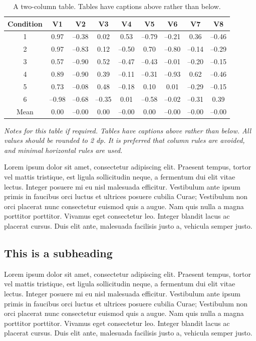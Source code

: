 \documentclass[paper=a4,fontsize=11pt,twocolumn]{article}
\begin{document}
\begin{table}
\begin{centering}
\caption{A two-column table. Tables have captions above rather than below.}\label{tab:two-column}%
	\begin{tabular}[\columnwidth]{ccccccccc}\toprule
	Condition & V1 & V2 & V3 & V4 & V5 & V6 & V7 & V8 \\
	\midrule
	1 & 0.97 & --0.38 & 0.02 & 0.53 & --0.79 & --0.21 & 0.36 & --0.46 \\
	2 & 0.97 & --0.83 & 0.12 & --0.50 & 0.70 & --0.80 & --0.14 & --0.29 \\
	3 & 0.57 & --0.90 & 0.52 & --0.47 & --0.43 & --0.01 & --0.20 & --0.15 \\
	4 & 0.89 & --0.90 & 0.39 & --0.11 & --0.31 & --0.93 & 0.62 & --0.46 \\
	5 & 0.73 & --0.08 & 0.48 & --0.18 & 0.10 & 0.01 & --0.29 & --0.15 \\
	6 & --0.98 & --0.68 & --0.35 & 0.01 & --0.58 & --0.02 & --0.31 & 0.39 \\
	\cmidrule{2-9}
	Mean & 0.00 & --0.00 & 0.00 & --0.00 & 0.00 & --0.00 & --0.00 & --0.00 \\
	\bottomrule
	\end{tabular}\par
	\medskip
\textit{Notes for this table if required. Tables have captions above rather than below. All values should be rounded to 2 dp. It is preferred that column rules are avoided, and minimal horizontal rules are used.}\end{centering}
\end{table}

Lorem ipsum dolor sit amet, consectetur adipiscing elit. Praesent tempus, tortor vel mattis tristique, est ligula sollicitudin neque, a fermentum dui elit vitae lectus. Integer posuere mi eu nisl malesuada efficitur. Vestibulum ante ipsum primis in faucibus orci luctus et ultrices posuere cubilia Curae; Vestibulum non orci placerat nunc consectetur euismod quis a augue. Nam quis nulla a magna porttitor porttitor. Vivamus eget consectetur leo. Integer blandit lacus ac placerat cursus. Duis elit ante, malesuada facilisis justo a, vehicula semper justo.

\subsection{This is a subheading}

Lorem ipsum dolor sit amet, consectetur adipiscing elit. Praesent tempus, tortor vel mattis tristique, est ligula sollicitudin neque, a fermentum dui elit vitae lectus. Integer posuere mi eu nisl malesuada efficitur. Vestibulum ante ipsum primis in faucibus orci luctus et ultrices posuere cubilia Curae; Vestibulum non orci placerat nunc consectetur euismod quis a augue. Nam quis nulla a magna porttitor porttitor. Vivamus eget consectetur leo. Integer blandit lacus ac placerat cursus. Duis elit ante, malesuada facilisis justo a, vehicula semper justo.
\end{document}

